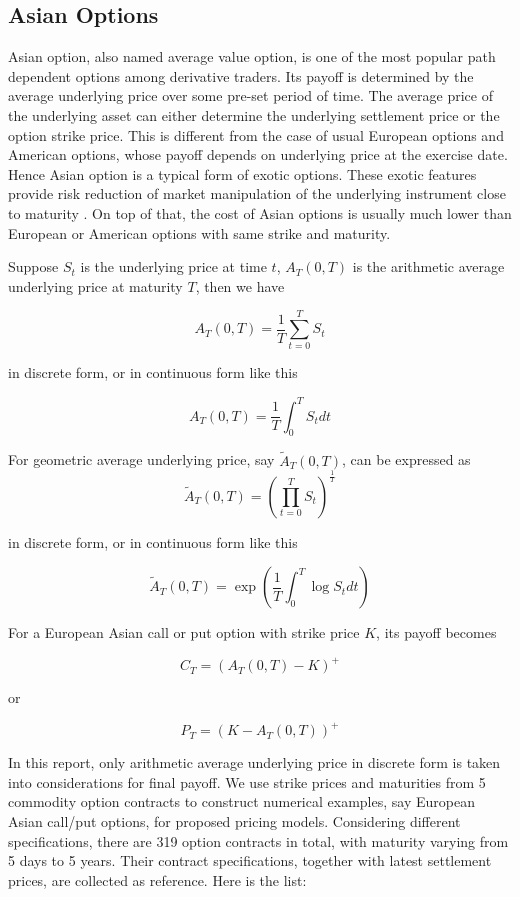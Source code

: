 \documentclass[10pt, a4paper, twocolumn]{article} %
\begin{document}
\subsection{Asian Options}

Asian option, also named average value option, is one of the most popular path dependent options among derivative traders. Its payoff is determined by the average underlying price over some pre-set period of time. The average price of the underlying asset can either determine the underlying settlement price or the option strike price. This is different from the case of usual European options and American options, whose payoff depends on underlying price at the exercise date. Hence Asian option is a typical form of exotic options. These exotic features provide risk reduction of market manipulation of the underlying instrument close to maturity \citep{kemna1990pricing}. On top of that, the cost of Asian options is usually much lower than European or American options with same strike and maturity.

Suppose $S_t$ is the underlying price at time $t$, $A_T(0, T)$ is the arithmetic average underlying price at maturity $T$, then we have

\[ A_T(0,T) = \frac 1T \sum_{t=0}^T S_t \]

in discrete form, or in continuous form like this

\[ A_T(0,T) = \frac 1T \int_0^T S_t dt\]

For geometric average underlying price, say $\tilde{A}_T(0, T)$, can be expressed as
\[ \tilde{A}_T(0, T) = (\prod_{t=0}^T S_t )^{\frac 1T}\]

in discrete form, or in continuous form like this

\[ \tilde{A}_T(0, T) = \exp (\frac 1T \int_0^T \log S_t dt) \]

For a European Asian call or put option with strike price $K$, its payoff becomes

\[ C_T = (A_T(0,T) - K)^+\]

or

\[ P_T = (K - A_T(0,T))^+\]

In this report, only arithmetic average underlying price in discrete form is taken into considerations for final payoff. We use strike prices and maturities from 5 commodity option contracts to construct numerical examples, say European Asian call/put options, for proposed pricing models. Considering different specifications, there are 319 option contracts in total, with maturity varying from 5 days to 5 years. Their contract specifications, together with latest settlement prices, are collected as reference. Here is the list:
\end{document}
